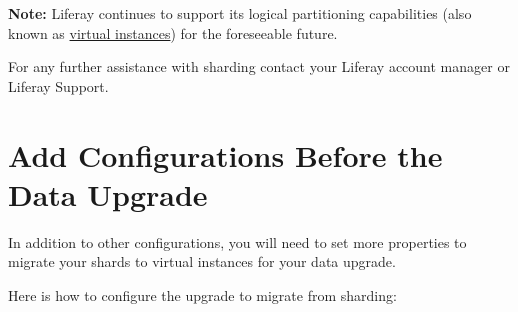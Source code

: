 \noindent\hrulefill

\textbf{Note:} Liferay continues to support its logical partitioning
capabilities (also known as
\href{/docs/7-2/user/-/knowledge_base/u/setting-up-a-virtual-instance}{virtual
instances}) for the foreseeable future.

\noindent\hrulefill

\noindent\hrulefill

For any further assistance with sharding contact your Liferay account
manager or Liferay Support.

\noindent\hrulefill

\section{Add Configurations Before the Data
Upgrade}\label{add-configurations-before-the-data-upgrade}

In addition to other configurations, you will need to set more
properties to migrate your shards to virtual instances for your data
upgrade.

Here is how to configure the upgrade to migrate from sharding:

